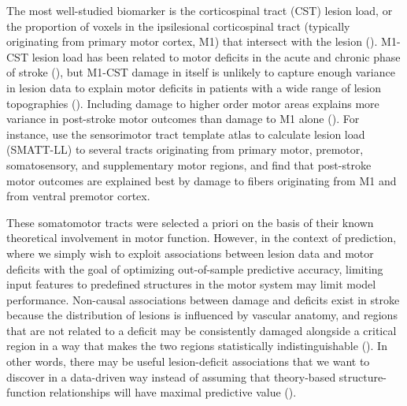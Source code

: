 \documentclass[10pt]{article}
\begin{document}
The most well-studied biomarker is the corticospinal tract (CST) lesion load, or the proportion of voxels in the ipsilesional corticospinal tract (typically originating from primary motor cortex, M1) that intersect with the lesion (\cite{Zhu2010-qh, Feng2015-du, Findlater2019-je, Lam2018-xh, Pineiro2000-dv}). M1-CST lesion load has been related to motor deficits in the acute and chronic phase of stroke (\cite{Boyd2017-gs, Kim2017-xe}), but M1-CST damage in itself is unlikely to capture enough variance in lesion data to explain motor deficits in patients with a wide range of lesion topographies (\cite{Park2016-te,Findlater2019-je}). Including damage to higher order motor areas explains more variance in post-stroke motor outcomes than damage to M1 alone (\cite{Ito2022-em,  Rondina2016-ds, Rondina2017-ij, Schulz2012-yy, Park2016-te}). For instance, \cite{Ito2022-em} use the sensorimotor tract template atlas to calculate lesion load (SMATT-LL) to several tracts originating from primary motor, premotor, somatosensory, and supplementary motor regions, and find that post-stroke motor outcomes are explained best by damage to fibers originating from M1 and from ventral premotor cortex. 

These somatomotor tracts were selected a priori on the basis of their known theoretical involvement in motor function. However, in the context of prediction, where we simply wish to exploit associations between lesion data and motor deficits with the goal of optimizing out-of-sample predictive accuracy, limiting input features to predefined structures in the motor system may limit model performance. Non-causal associations between damage and deficits exist in stroke because the distribution of lesions is influenced by vascular anatomy, and regions that are not related to a deficit may be consistently damaged alongside a critical region in a way that makes the two regions statistically indistinguishable (\cite{Mah2014-cb}). In other words, there may be useful lesion-deficit associations that we want to discover in a data-driven way instead of assuming that theory-based structure-function relationships will have maximal predictive value (\cite{Bzdok2020-py, Bonkhoff2022-op}).
\end{document}
